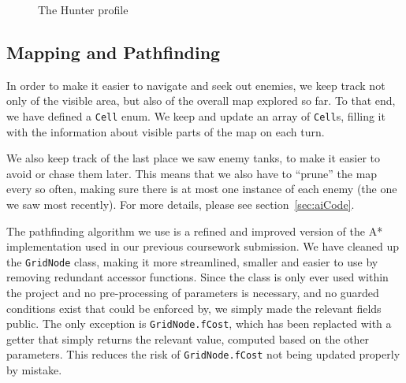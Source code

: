 \documentclass[11pt]{article}
\begin{document}
{\begin{landscape}
\begin{figure}[h]
  \caption{The Hunter profile}
  \label{fig:hunter}
\end{figure}
\vspace*{\fill}
\end{landscape}
}

\subsection{Mapping and Pathfinding}

In order to make it easier to navigate and seek out enemies, we keep track not only of the visible area, but also of the overall map explored so far.  To that end, we have defined a \verb|Cell| enum. We keep and update an array of \verb|Cell|s, filling it with the information about visible parts of the map on each turn. 

We also keep track of the last place we saw enemy tanks, to make it easier to avoid or chase them later. This means that we also have to ``prune'' the map every so often, making sure there is at most one instance of each enemy (the one we saw most recently). For more details, please see section~\ref{sec:aiCode}.

The pathfinding algorithm we use is a refined and improved version of the A* implementation used in our previous coursework submission\cite{theGloriousWe}. We have cleaned up the \verb|GridNode| class, making it more streamlined, smaller and easier to use by removing redundant accessor functions. Since the class is only ever used within the project and no pre-processing of parameters is necessary, and no guarded conditions exist that could be enforced by, we simply made the relevant fields public. The only exception is \verb|GridNode.fCost|, which has been replacted with a getter that simply returns the relevant value, computed based on the other parameters. This reduces the risk of \verb|GridNode.fCost| not being updated properly by mistake.
\end{document}
